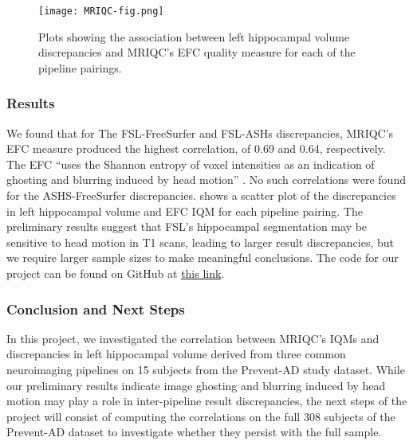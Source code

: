 \documentclass[../main.tex]{subfiles}
\begin{document}
\begin{figure}[!h]
	\centering
	\texttt{[image: MRIQC-fig.png]}
	\caption{Plots showing the association between left hippocampal volume discrepancies and MRIQC’s EFC quality measure for each of the pipeline pairings.}
	\label{fig:MRIQC-fig}
\end{figure}

\subsubsection{Results}

We found that for The FSL-FreeSurfer and FSL-ASHs discrepancies, MRIQC’s EFC measure produced the highest correlation, of 0.69 and 0.64, respectively. The EFC “uses the Shannon entropy of voxel intensities as an indication of ghosting and blurring induced by head motion” \citep{MRIQCdoc}. No such correlations were found for the ASHS-FreeSurfer discrepancies.  shows a scatter plot of the discrepancies in left hippocampal volume and EFC IQM for each pipeline pairing. The preliminary results suggest that FSL’s hippocampal segmentation may be sensitive to head motion in T1 scans, leading to larger result discrepancies, but we require larger sample sizes to make meaningful conclusions. The code for our project can be found on GitHub at \href{https://github.com/jacobsanz97/Pipeline-Discrepancy-Exploration}{this link}. 

\subsubsection{Conclusion and Next Steps}

In this project, we investigated the correlation between MRIQC’s IQMs and discrepancies in left hippocampal volume derived from three common neuroimaging pipelines on 15 subjects from the Prevent-AD study dataset. While our preliminary results indicate image ghosting and blurring induced by head motion may play a role in inter-pipeline result discrepancies, the next steps of the project will consist of computing the correlations on the full 308 subjects of the Prevent-AD dataset to investigate whether they persist with the full sample.
\end{document}

